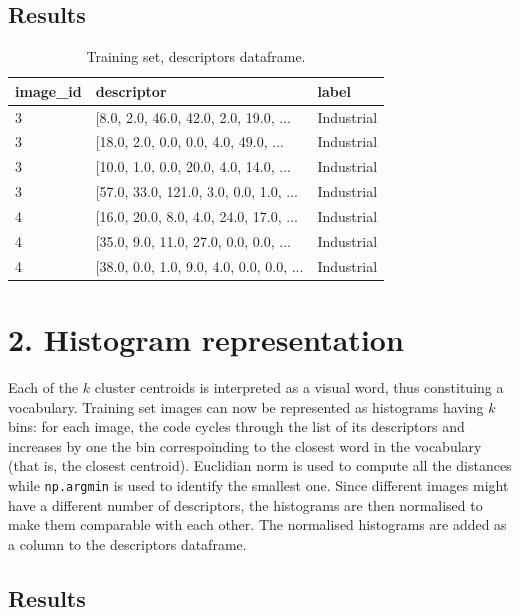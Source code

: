 \documentclass[12pt]{article}
\begin{document}
  \subsection*{Results}

	\begin{table}[H] 
		\centering
		\caption*{Training set, descriptors dataframe.}
		\begin{tabular}{lll}
			\toprule
      image\_id & descriptor & label \\
      \midrule
      3 &  [8.0, 2.0, 46.0, 42.0, 2.0, 19.0, ...    &  Industrial \\
      3 &  [18.0, 2.0, 0.0, 0.0, 4.0, 49.0, ...     &  Industrial \\
      3 &  [10.0, 1.0, 0.0, 20.0, 4.0, 14.0, ...    &  Industrial \\
      3 &  [57.0, 33.0, 121.0, 3.0, 0.0, 1.0, ...   &  Industrial \\
      4 &  [16.0, 20.0, 8.0, 4.0, 24.0, 17.0, ...   &  Industrial \\
      4 &  [35.0, 9.0, 11.0, 27.0, 0.0, 0.0, ...    &  Industrial \\
      4 &  [38.0, 0.0, 1.0, 9.0, 4.0, 0.0, 0.0, ... &  Industrial \\
			\bottomrule
		\end{tabular}
	\end{table}



  \section*{2. Histogram representation}

  Each of the \( k \) cluster centroids is interpreted as a visual word, thus constituing a vocabulary. Training set images can now be represented as histograms having \( k \) bins: for each image, the code cycles through the list of its descriptors and increases by one the bin correspoinding to the closest word in the vocabulary (that is, the closest centroid). Euclidian norm is used to compute all the distances while \texttt{np.argmin} is used to identify the smallest one. Since different images might have a different number of descriptors, the histograms are then normalised to make them comparable with each other. The normalised histograms are added as a column to the descriptors dataframe.

  \subsection*{Results}
\end{document}
